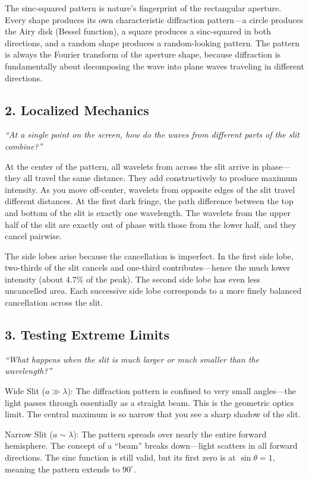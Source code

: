 The sinc-squared pattern is nature's fingerprint of the rectangular aperture. Every shape produces its own characteristic diffraction pattern---a circle produces the Airy disk (Bessel function), a square produces a sinc-squared in both directions, and a random shape produces a random-looking pattern. The pattern is always the Fourier transform of the aperture shape, because diffraction is fundamentally about decomposing the wave into plane waves traveling in different directions.

\subsection*{2. Localized Mechanics}
\textit{``At a single point on the screen, how do the waves from different parts of the slit combine?''}

At the center of the pattern, all wavelets from across the slit arrive in phase---they all travel the same distance. They add constructively to produce maximum intensity. As you move off-center, wavelets from opposite edges of the slit travel different distances. At the first dark fringe, the path difference between the top and bottom of the slit is exactly one wavelength. The wavelets from the upper half of the slit are exactly out of phase with those from the lower half, and they cancel pairwise.

The side lobes arise because the cancellation is imperfect. In the first side lobe, two-thirds of the slit cancels and one-third contributes---hence the much lower intensity (about $4.7\%$ of the peak). The second side lobe has even less uncancelled area. Each successive side lobe corresponds to a more finely balanced cancellation across the slit.

\subsection*{3. Testing Extreme Limits}
\textit{``What happens when the slit is much larger or much smaller than the wavelength?''}

Wide Slit ($a \gg \lambda$): The diffraction pattern is confined to very small angles---the light passes through essentially as a straight beam. This is the geometric optics limit. The central maximum is so narrow that you see a sharp shadow of the slit.

Narrow Slit ($a \sim \lambda$): The pattern spreads over nearly the entire forward hemisphere. The concept of a ``beam'' breaks down---light scatters in all forward directions. The sinc function is still valid, but its first zero is at $\sin\theta = 1$, meaning the pattern extends to $90^\circ$.

